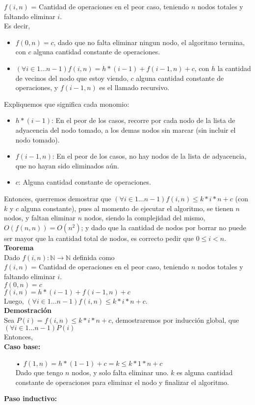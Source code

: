 $f(i,n)$ = Cantidad de operaciones en el peor caso, teniendo $n$ nodos totales y faltando eliminar $i$.\\
Es decir,\par
\begin{itemize}
	\item$f(0,n) = c$, dado que no falta eliminar ningun nodo, el algoritmo termina, con $c$ alguna cantidad constante de operaciones.\par
	\item $(\forall i \in {1...n-1}) f(i,n) = h*(i-1) + f(i-1,n) + c$, con $h$ la cantidad de vecinos del nodo que estoy viendo, $c$ alguna cantidad constante de operaciones, y $f(i-1,n)$ es el llamado recursivo.\\
\end{itemize}
Expliquemos que significa cada monomio:
\begin{itemize}
	\item $h*(i-1)$: En el peor de los casos, recorre por cada nodo de la lista de adyacencia del nodo tomado, a los demas nodos sin marcar (sin incluir el nodo tomado).
	\item $f(i-1,n)$: En el peor de los casos, no hay nodos de la lista de adyacencia, que no hayan sido eliminados aún.
	\item $c$: Alguna cantidad constante de operaciones.
\end{itemize}
Entonces, querremos demostrar que $(\forall i \in {1...n-1}) f(i,n) \leq k*i*n + c$ (con $k$ y $c$ alguna constante), pues al momento de ejecutar el algoritmo, se tienen $n$ nodos, y faltan eliminar $n$ nodos, siendo la complejidad del mismo, $O(f(n,n)) = O(n^{2})$; y dado que la cantidad de nodos por borrar no puede ser mayor que la cantidad total de nodos, es correcto pedir que $0 \leq i < n$.\\

\newpage
{\large\textbf{Teorema}}\\
Dado $f(i,n): \mathbb{N} \rightarrow \mathbb{N}$ definida como\\
$f(i,n)$ = Cantidad de operaciones  en el peor caso, teniendo $n$ nodos totales y faltando eliminar $i$.\\
$f(0,n) = c$\\
$f(i,n) = h*(i-1) + f(i-1,n) + c$\\
Luego, $(\forall i \in {1...n-1}) f(i,n) \leq k*i*n + c$.\\

{\large\textbf{Demostración}}\\
Sea $P(i) = f(i,n) \leq k*i*n + c$, demostraremos por inducción global, que $(\forall i \in {1...n-1}) P(i)$\\
Entonces,\\
\textbf{Caso base:}
\begin{itemize}
    \item[•] $f(1,n) = h*(1-1) + c = k \leq k*1*n + c$\\
    Dado que tengo $n$ nodos, y solo falta eliminar uno. $k$ es alguna cantidad constante de operaciones para eliminar el nodo y finalizar el algoritmo.
\end{itemize}
\textbf{Paso inductivo:}\\

